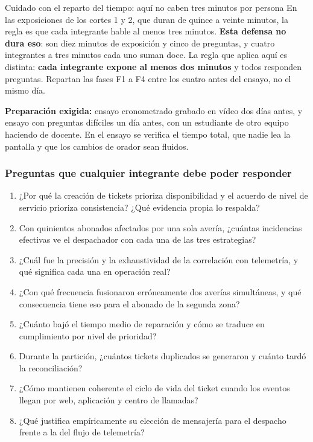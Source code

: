 \documentclass[11pt,a4paper]{article}
\begin{document}
	\begin{avisoBox}{Cuidado con el reparto del tiempo: aquí no caben tres minutos por persona}
		En las exposiciones de los cortes 1 y 2, que duran de quince a veinte minutos, la regla es que cada integrante hable al menos tres minutos. \textbf{Esta defensa no dura eso}: son diez minutos de exposición y cinco de preguntas, y cuatro integrantes a tres minutos cada uno suman doce. La regla que aplica aquí es distinta: \textbf{cada integrante expone al menos dos minutos} y todos responden preguntas. Repartan las fases F1 a F4 entre los cuatro antes del ensayo, no el mismo día.
	\end{avisoBox}
	
	\textbf{Preparación exigida:} ensayo cronometrado grabado en vídeo dos días antes, y ensayo con preguntas difíciles un día antes, con un estudiante de otro equipo haciendo de docente. En el ensayo se verifica el tiempo total, que nadie lea la pantalla y que los cambios de orador sean fluidos.
	
	\subsubsection{Preguntas que cualquier integrante debe poder responder}
	
	\begin{enumerate}[leftmargin=*,itemsep=3pt]
		\item ¿Por qué la creación de tickets prioriza disponibilidad y el acuerdo de nivel de servicio prioriza consistencia? ¿Qué evidencia propia lo respalda?
		\item Con quinientos abonados afectados por una sola avería, ¿cuántas incidencias efectivas ve el despachador con cada una de las tres estrategias?
		\item ¿Cuál fue la precisión y la exhaustividad de la correlación con telemetría, y qué significa cada una en operación real?
		\item ¿Con qué frecuencia fusionaron erróneamente dos averías simultáneas, y qué consecuencia tiene eso para el abonado de la segunda zona?
		\item ¿Cuánto bajó el tiempo medio de reparación y cómo se traduce en cumplimiento por nivel de prioridad?
		\item Durante la partición, ¿cuántos tickets duplicados se generaron y cuánto tardó la reconciliación?
		\item ¿Cómo mantienen coherente el ciclo de vida del ticket cuando los eventos llegan por web, aplicación y centro de llamadas?
		\item ¿Qué justifica empíricamente su elección de mensajería para el despacho frente a la del flujo de telemetría?
	\end{enumerate}
	
\end{document}
